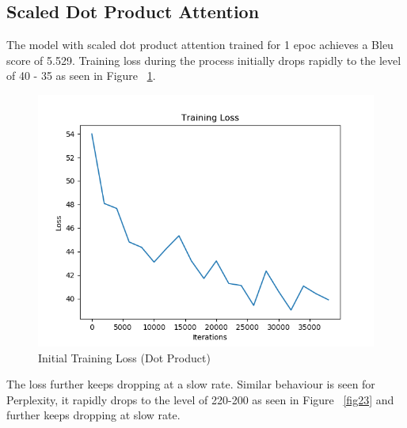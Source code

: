 \documentclass[11pt,a4paper]{article}
\begin{document}

\subsection{Scaled Dot Product Attention}
The model with scaled dot product attention trained for 1 epoc achieves a Bleu score of 5.529.
Training loss during the process initially drops rapidly to the level of 40 - 35 as seen in Figure ~\ref{fig21}.
\begin{figure}[!htbp]
\includegraphics[width=\linewidth]{de_dot_loss_1.png}
\caption{Initial Training Loss (Dot Product)}
\label{fig21}
\end{figure}

The loss further keeps dropping at a slow rate. Similar behaviour is seen for Perplexity, it rapidly drops to the level of 220-200 as seen in Figure ~\ref{fig23} and further keeps dropping at slow rate.


\end{document}
